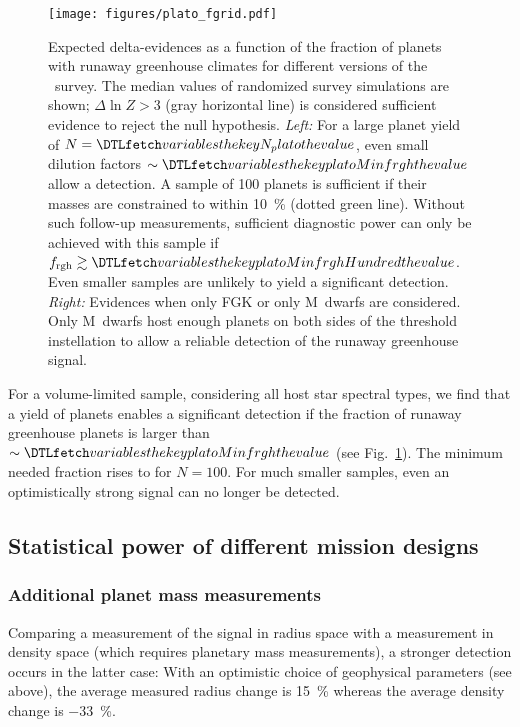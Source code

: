 \documentclass[twocolumn,twocolappendix]{aastex631}
\begin{document}
    \begin{figure*}[ht!]
        \begin{centering}
            \texttt{[image: figures/plato\_fgrid.pdf]}
            \caption{
            Expected delta-evidences as a function of the fraction of planets with runaway greenhouse climates for different versions of the \plato\ survey.
            The median values of randomized survey simulations are shown; $\Delta \ln Z > 3$ (gray horizontal line) is considered sufficient evidence to reject the null hypothesis.
            \textit{Left:} For a large planet yield of $N = \var{N_plato}$, even small dilution factors $\sim \var{platoMinfrgh}$ allow a detection.
                A sample of 100 planets is sufficient if their masses are constrained to within \SI{10}{\percent} (dotted green line).
                Without such follow-up measurements, sufficient diagnostic power can only be achieved with this sample if $f_\mathrm{rgh} \gtrsim \var{platoMinfrghHundred}$.
               Even smaller samples are unlikely to yield a significant detection.
            \textit{Right:} Evidences when only FGK or only M~dwarfs are considered.
                Only M~dwarfs host enough planets on both sides of the threshold instellation to allow a reliable detection of the runaway greenhouse signal.
            }
            \label{fig:plato_fgrid}
        \end{centering}
    \end{figure*}

For a volume-limited sample, considering all host star spectral types, we find that a yield of  planets enables a significant detection if the fraction of runaway greenhouse planets is larger than $\sim \var{platoMinfrgh}$ (see Fig.~\ref{fig:plato_fgrid}).
The minimum needed fraction rises to  for $N = 100$.
For much smaller samples, even an optimistically strong signal can no longer be detected.


\subsection{Statistical power of different mission designs}\label{sec:statpower_missions}

\subsubsection{Additional planet mass measurements}\label{sec:res_followup}
Comparing a measurement of the signal in radius space with a measurement in density space (which requires planetary mass measurements), a stronger detection occurs in the latter case:
With an optimistic choice of geophysical parameters (see above), the average measured radius change is \SI{+15}{\percent} whereas the average density change is \SI{-33}{\percent}.
\end{document}
